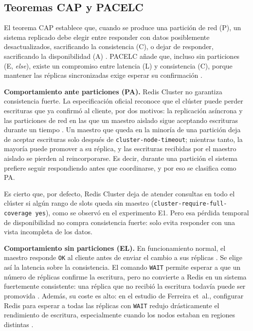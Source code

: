 \documentclass[11pt,a4paper]{article}
\begin{document}
\subsection{Teoremas CAP y PACELC}

El teorema CAP establece que, cuando se produce una partición de red (P), un
sistema replicado debe elegir entre responder con datos posiblemente
desactualizados, sacrificando la consistencia (C), o dejar de responder,
sacrificando la disponibilidad (A) \cite{ahmed2023consistency}. PACELC añade
que, incluso sin particiones (E, \emph{else}), existe un compromiso entre
latencia (L) y consistencia (C), porque mantener las réplicas sincronizadas
exige esperar su confirmación \cite{ahmed2023consistency}.

\textbf{Comportamiento ante particiones (PA).} Redis Cluster no garantiza
consistencia fuerte. La especificación oficial reconoce que el clúster puede
perder escrituras que ya confirmó al cliente, por dos motivos: la replicación
asíncrona y las particiones de red en las que un maestro aislado sigue
aceptando escrituras durante un tiempo \cite{redis2026clusterspec}. Un maestro
que queda en la minoría de una partición deja de aceptar escrituras solo
después de \texttt{cluster-node-timeout}; mientras tanto, la mayoría puede
promover a su réplica, y las escrituras recibidas por el maestro aislado se
pierden al reincorporarse. Es decir, durante una partición el sistema prefiere
seguir respondiendo antes que coordinarse, y por eso se clasifica como PA.

Es cierto que, por defecto, Redis Cluster deja de atender consultas en todo el
clúster si algún rango de slots queda sin maestro
(\texttt{cluster-require-full-coverage yes}), como se observó en el
experimento E1. Pero esa pérdida temporal de disponibilidad no compra
consistencia fuerte: solo evita responder con una vista incompleta de los
datos.

\textbf{Comportamiento sin particiones (EL).} En funcionamiento normal, el
maestro responde \texttt{OK} al cliente antes de enviar el cambio a sus
réplicas \cite{redis2026replication}. Se elige así la latencia sobre la
consistencia. El comando \texttt{WAIT} permite esperar a que un número de
réplicas confirme la escritura, pero no convierte a Redis en un sistema
fuertemente consistente: una réplica que no recibió la escritura todavía puede
ser promovida \cite{redis2026clusterspec}. Además, su coste es alto: en el
estudio de Ferreira et~al., configurar Redis para esperar a todas las réplicas
con \texttt{WAIT} redujo drásticamente el rendimiento de escritura,
especialmente cuando los nodos estaban en regiones distintas
\cite{ferreira2024impacts, ferreira2025benchmarking}.
\end{document}

